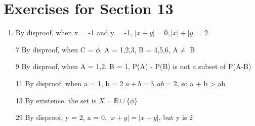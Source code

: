 \documentclass[12pt]{article}
\begin{document}
\section*{Exercises for Section 13}
\begin{enumerate}
	\item By disproof, when x = -1 and y = -1, $|x+y| = 0, |x| + |y| = 2$
	\item [7] By disproof, when C = $\phi$, A = {1,2,3}, B = {4,5,6}, A$\neq$ B
	\item [9] By disproof, when A = {1,2}, B = {1}, P(A) - P(B) is not a subset of P(A-B)
	\item [11] By disproof, when a = 1, b = 2 $a+b = 3, ab = 2$, so a + b > ab
	\item [13] By existence, the set is $X = \mathbb{R} \cup \{\phi\}$
	\item [29] By disproof, y = 2, x = 0, $|x+y| = |x-y|$, but y is 2
\end{enumerate}
\end{document}
